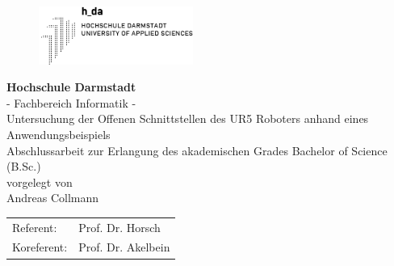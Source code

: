 \begin{titlepage}
  \centering
  \begin{figure}[h]
  \centering
  \includegraphics[width=0.45\textwidth]{pic/h_da.png}
  \label{fig:innoq}
  \end{figure}	
  \zab {2cm}
  \textbf{\Large Hochschule Darmstadt} \\	
  {\Large - Fachbereich Informatik -} \\
  \zab {3cm}
  {\large Untersuchung der Offenen Schnittstellen des UR5 Roboters anhand eines Anwendungsbeispiels} \\
  \zab {2cm}
  Abschlussarbeit zur Erlangung des akademischen Grades Bachelor of Science
  (B.Sc.) \\	
  \zab {1cm}
  vorgelegt von \\
  \zab {1cm}
  {\Large Andreas Collmann} \\
  \zab {2cm}
  \begin{tabular}{ll}
  Referent: & Prof. Dr. Horsch\\
  Koreferent: & Prof. Dr. Akelbein\\
  \end{tabular}
\end{titlepage}